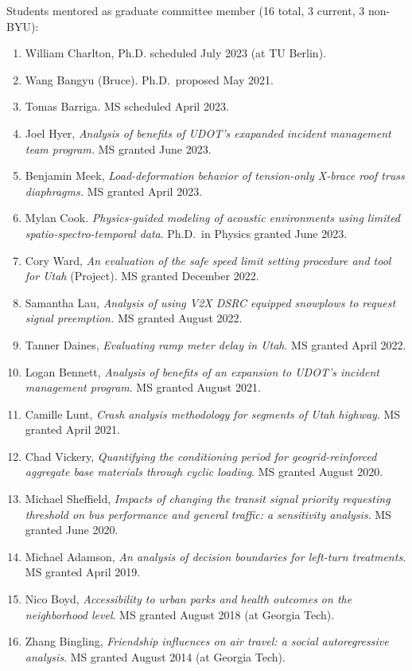 \documentclass[margin,line]{res}
\newcounter{enuminitialize}
\newenvironment{myenum}[1][]
{%
 \setcounter{enuminitialize}{#1}
 \addtocounter{enuminitialize}{2}
 \begin{enumerate}[left= 4pt, itemsep=12pt, start=\value{enuminitialize}, label=\arabic*\addtocounter{enumi}{-2}]
}
{%
 \end{enumerate}
}
\begin{document}
\begin{resume}
Students mentored as graduate committee member (16 total, 3 current, 3 non-BYU):
\vspace{0.3cm}
\begin{myenum}[16]
  \item William Charlton, Ph.D. scheduled July 2023 (at TU Berlin).
  \item Wang Bangyu (Bruce). Ph.D.\ proposed May 2021.
  \item Tomas Barriga. MS scheduled April 2023.
  \item Joel Hyer, \textit{Analysis of benefits of UDOT's exapanded incident management team program.} MS granted June 2023.
  \item Benjamin Meek, \textit{Load-deformation behavior of tension-only X-brace roof truss diaphragms.} MS granted April 2023.
  \item Mylan Cook. \textit{Physics-guided modeling of acoustic environments using limited spatio-spectro-temporal data}. Ph.D.\ in Physics granted June 2023.
  \item Cory Ward, \textit{An evaluation of the safe speed limit setting procedure and tool for Utah} (Project). MS granted December 2022.
  \item Samantha Lau, \textit{Analysis of using V2X DSRC equipped snowplows to request signal preemption.} MS granted August 2022.
  \item Tanner Daines, \textit{Evaluating ramp meter delay in Utah}. MS granted April 2022.
  \item Logan Bennett, \textit{Analysis of benefits of an expansion to UDOT’s incident management program}. MS granted August 2021.
  \item Camille Lunt, \textit{Crash analysis methodology for segments of Utah highway}. MS granted April 2021.
  \item Chad Vickery, \textit{Quantifying the conditioning period for geogrid-reinforced aggregate base materials through cyclic loading}. MS granted August 2020.
  \item Michael Sheffield, \textit{Impacts of changing the transit signal priority requesting threshold on bus performance and general traffic: a sensitivity analysis}. MS granted June 2020.
  \item Michael Adamson, \textit{An analysis of decision boundaries for left-turn treatments}. MS granted April 2019.
  \item Nico Boyd, \textit{Accessibility to urban parks and health outcomes on the neighborhood level}. MS granted August 2018 (at Georgia Tech).
  \item Zhang Bingling, \textit{Friendship influences on air travel: a social autoregressive analysis}. MS granted August 2014 (at Georgia Tech).
\end{myenum}



\end{resume}
\end{document}
